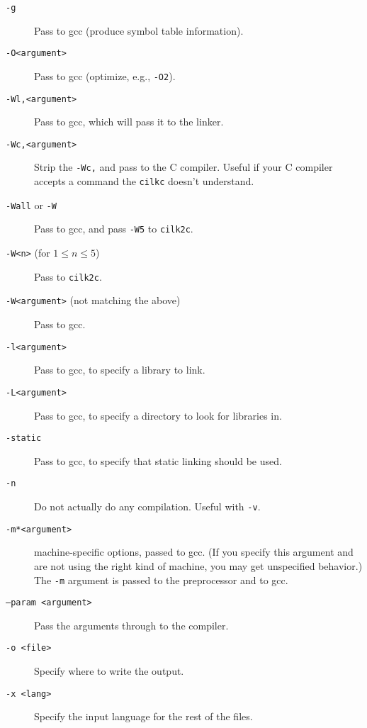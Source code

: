 \begin{description}
\item[\texttt{-g}\\] Pass to gcc (produce symbol table information).
\item[\texttt{-O<argument>}\\] Pass to gcc (optimize, e.g.,
\texttt{-O2}).
\item[\texttt{-Wl,<argument>}\\] Pass to gcc, which will pass it to the linker.
\item[\texttt{-Wc,<argument>}\\] Strip the \texttt{-Wc,} and pass to the C compiler.  Useful if your C compiler accepts a command the \texttt{cilkc} doesn't understand.
\item[\texttt{-Wall} or \texttt{-W}] Pass to gcc, and pass \texttt{-W5} to \texttt{cilk2c}.
\item[\texttt{-W<n>} (for $1\leq{}n\leq{}5$)] Pass to \texttt{cilk2c}.
\item[\texttt{-W<argument>} (not matching the above)] Pass to gcc.
\item[\texttt{-l<argument>}\\] Pass to gcc, to specify a library to link.
\item[\texttt{-L<argument>}\\] Pass to gcc, to specify a directory to
look for libraries in.
\item[\texttt{-static}\\] Pass to gcc, to specify that static linking should be used.
\item[\texttt{-n}\\]  Do not actually do any compilation.  Useful with \texttt{-v}.

\item[\texttt{-m*<argument>}\\] machine-specific options, passed to
gcc.  (If you specify this argument and are not using the right kind
of machine, you may get unspecified behavior.)  The \texttt{-m}
argument is passed to the preprocessor and to gcc.


\item[\texttt{--param <argument>}\\] Pass the arguments through to the compiler.
\item[\texttt{-o <file>}\\] Specify where to write the output.
\item[\texttt{-x <lang>}\\] Specify the input language for the rest of the files.


\end{description}
